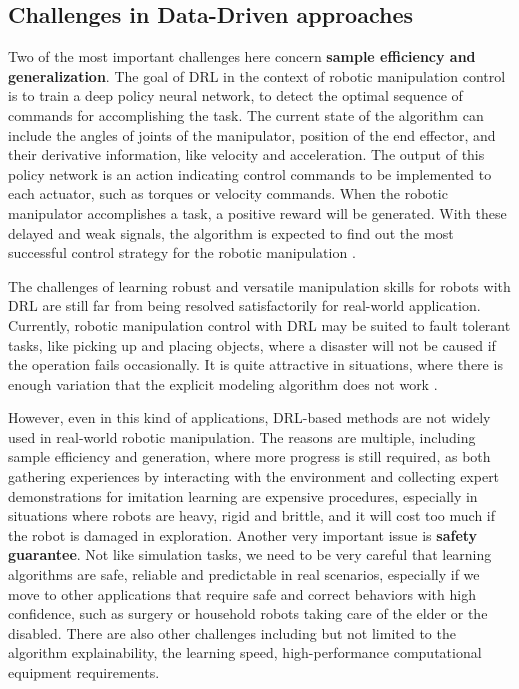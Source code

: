 \subsection{Challenges in Data-Driven approaches}

Two of the most important challenges here concern \textbf{sample efficiency and generalization}.
The goal of DRL in the context of robotic manipulation
control is to train a deep policy neural network, to detect the optimal
sequence of commands for accomplishing the task. The current state of the algorithm can include
the angles of joints of the manipulator, position of the end effector, and their derivative information,
like velocity and acceleration. The output of this policy network is an action indicating control
commands to be implemented to each actuator, such as torques or velocity commands. When the robotic manipulator
accomplishes a task, a positive reward will be generated. With these delayed and weak
signals, the algorithm is expected to find out the most successful control strategy for the
robotic manipulation \cite{liu2021deep}.

The challenges of learning robust and versatile manipulation skills
for robots with DRL are still far from being resolved satisfactorily for real-world application.
Currently, robotic manipulation control with DRL may be suited to fault tolerant
tasks, like picking up and placing objects, where a disaster will not be caused if the
operation fails occasionally. It is quite attractive in situations, where there is enough
variation that the explicit modeling algorithm does not work \cite{liu2021deep}.

However, even in this kind of applications, DRL-based methods are not widely
used in real-world robotic manipulation. The reasons are multiple, including sample efficiency and generation,
where more progress is still required, as both gathering experiences by interacting with
the environment and collecting expert demonstrations for imitation learning are expensive
procedures, especially in situations where robots are heavy, rigid and brittle, and it will
cost too much if the robot is damaged in exploration. Another very important issue is
\textbf{safety guarantee}. Not like simulation tasks, we need to be very careful that learning
algorithms are safe, reliable and predictable in real scenarios, especially if we move to
other applications that require safe and correct behaviors with high confidence, such as
surgery or household robots taking care of the elder or the disabled. There are also other
challenges including but not limited to the algorithm explainability, the learning speed,
high-performance computational equipment requirements. \cite{liu2021deep}



